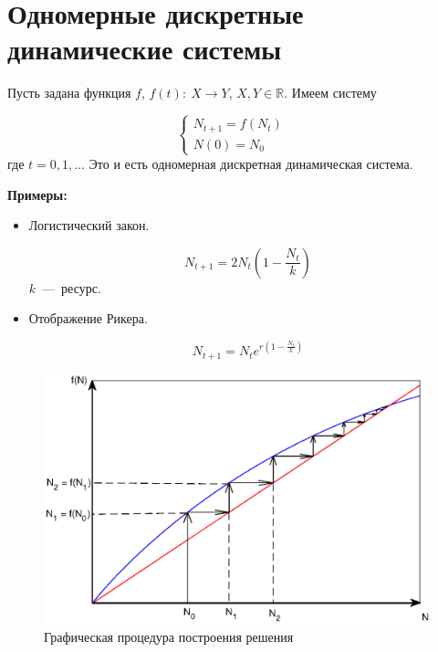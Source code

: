 \section{Одномерные дискретные динамические системы}

Пусть задана функция $f$, $f(t): \: X \to Y$, $X, Y \in \mathbb{R}$. Имеем систему

\begin{equation}
\begin{cases}
\label{ch1.sys}
N_{t+1} = f(N_t)&\\
N(0) = N_0&
\end{cases}
\end{equation}
где $t = 0, 1, \ldots$ Это и есть одномерная дискретная динамическая система.

\textbf{Примеры:}
\begin{itemize}

\item Логистический закон.

\begin{equation*}
N_{t + 1} = 2 N_t \left(1 - \frac{N_t}{k} \right)
\end{equation*}
$k$~---~ресурс.

\item Отображение Рикера.

\begin{equation*}
N_{t+1} = N_t e^{r \left(1 - \frac{N_t}{k}\right)}
\end{equation*}

\end{itemize}

\begin{figure}[h]
\begin{center}
\includegraphics[width=0.8\linewidth]{ch1/ch1_fig1.eps}
\caption{Графическая процедура построения решения}
\label{ch1.fig1}
\end{center}
\end{figure}


